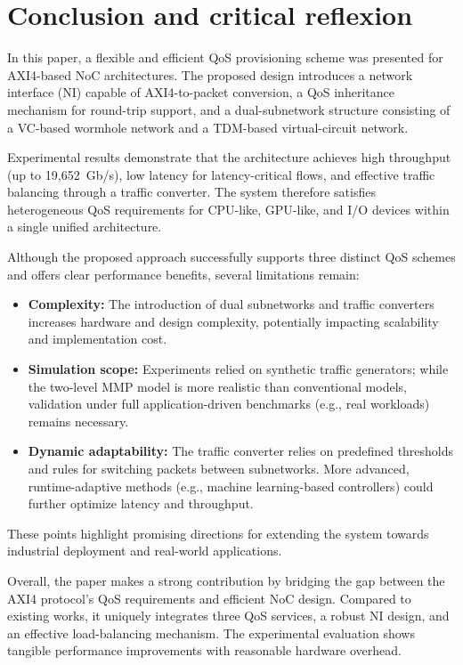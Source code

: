 \chapter{Conclusion and critical reflexion}

In this paper, a flexible and efficient QoS provisioning scheme was presented for AXI4-based NoC architectures. The proposed design introduces a network interface (NI) capable of AXI4-to-packet conversion, a QoS inheritance mechanism for round-trip support, and a dual-subnetwork structure consisting of a VC-based wormhole network and a TDM-based virtual-circuit network.  

Experimental results demonstrate that the architecture achieves high throughput (up to 19{,}652~Gb/s), low latency for latency-critical flows, and effective traffic balancing through a traffic converter. The system therefore satisfies heterogeneous QoS requirements for CPU-like, GPU-like, and I/O devices within a single unified architecture.

Although the proposed approach successfully supports three distinct QoS schemes and offers clear performance benefits, several limitations remain:

\begin{itemize}
    \item \textbf{Complexity:} The introduction of dual subnetworks and traffic converters increases hardware and design complexity, potentially impacting scalability and implementation cost.  
    \item \textbf{Simulation scope:} Experiments relied on synthetic traffic generators; while the two-level MMP model is more realistic than conventional models, validation under full application-driven benchmarks (e.g., real workloads) remains necessary.  
    \item \textbf{Dynamic adaptability:} The traffic converter relies on predefined thresholds and rules for switching packets between subnetworks. More advanced, runtime-adaptive methods (e.g., machine learning-based controllers) could further optimize latency and throughput.  
\end{itemize}

These points highlight promising directions for extending the system towards industrial deployment and real-world applications.

Overall, the paper makes a strong contribution by bridging the gap between the AXI4 protocol’s QoS requirements and efficient NoC design. Compared to existing works, it uniquely integrates three QoS services, a robust NI design, and an effective load-balancing mechanism. The experimental evaluation shows tangible performance improvements with reasonable hardware overhead. 

